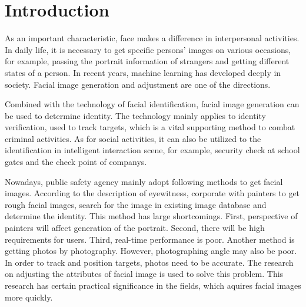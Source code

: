 \section{Introduction}
As an important characteristic, face makes a difference in interpersonal activities.
In daily life, it is necessary to get specific persons' images on various occasions, for example, passing the portrait information of strangers and getting different states of a person.
In recent years, machine learning has developed deeply in society.
Facial image generation and adjustment are one of the directions.

Combined with the technology of facial identification, facial image generation can be used to determine identity.
The technology mainly applies to identity verification, used to track targets, which is a vital supporting method to combat criminal activities.
As for social activities, it can also be utilized to the identification in intelligent interaction scene,   for example, security check at school gates and the check point of companys.

Nowadays, public safety agency mainly adopt following methods to get facial images.
According to the description of eyewitness, corporate with painters to get rough facial images,
    search for the image in existing image database and determine the identity.
This method has large shortcomings.
First, perspective of painters will affect generation of the portrait.
    Second, there will be high requirements for users.
    Third, real-time performance is poor.
Another method is getting photos by photography. However, photographing angle may also be poor.
In order to track and position targets, photos need to be accurate.
The research on adjusting the attributes of facial image is used to solve this problem.
This research has certain practical significance in the fields, which aquires facial images more quickly. 